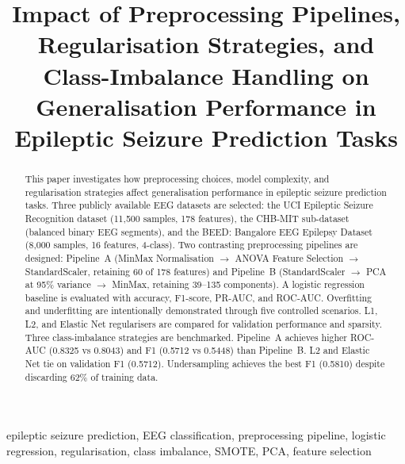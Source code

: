 \documentclass[conference]{IEEEtran}
\begin{document}
\title{Impact of Preprocessing Pipelines, Regularisation Strategies,
and Class-Imbalance Handling on Generalisation Performance
in Epileptic Seizure Prediction Tasks}

\author{
}

\maketitle

\begin{abstract}
This paper investigates how preprocessing choices, model complexity, and
regularisation strategies affect generalisation performance in epileptic
seizure prediction tasks. Three publicly available EEG datasets are
selected: the UCI Epileptic Seizure Recognition dataset (11{,}500
samples, 178 features), the CHB-MIT sub-dataset (balanced binary EEG
segments), and the BEED: Bangalore EEG Epilepsy Dataset (8{,}000
samples, 16 features, 4-class). Two contrasting preprocessing pipelines
are designed: Pipeline~A (MinMax Normalisation $\rightarrow$ ANOVA
Feature Selection $\rightarrow$ StandardScaler, retaining 60 of 178
features) and Pipeline~B (StandardScaler $\rightarrow$ PCA at 95\%
variance $\rightarrow$ MinMax, retaining 39--135 components). A logistic
regression baseline is evaluated with accuracy, F1-score, PR-AUC, and
ROC-AUC. Overfitting and underfitting are intentionally demonstrated
through five controlled scenarios. L1, L2, and Elastic Net regularisers
are compared for validation performance and sparsity. Three
class-imbalance strategies are benchmarked. Pipeline~A achieves higher
ROC-AUC (0.8325 vs 0.8043) and F1 (0.5712 vs 0.5448) than Pipeline~B.
L2 and Elastic Net tie on validation F1 (0.5712). Undersampling achieves
the best F1 (0.5810) despite discarding 62\% of training data.
\end{abstract}

\begin{IEEEkeywords}
epileptic seizure prediction, EEG classification, preprocessing pipeline,
logistic regression, regularisation, class imbalance, SMOTE, PCA,
feature selection
\end{IEEEkeywords}
\end{document}
